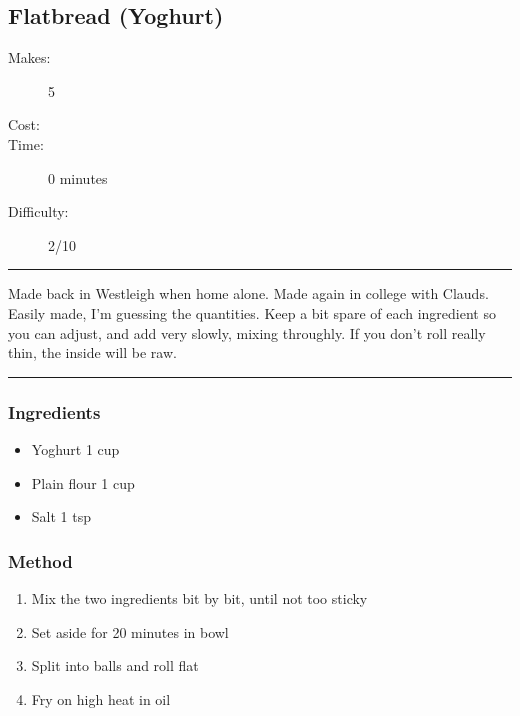\documentclass[]{article}
\begin{document}
\subsection*{\center\huge Flatbread (Yoghurt)}
\begin{description}
\item[Makes:] 5 
\item[Cost:] \textdollar
\item[Time:] 0 minutes
\item[Difficulty:] 2/10
\end{description}
\vspace{0.2cm}\hrule\vspace{0.5cm}
\begin{adjustwidth}{0.5 cm}{0.5 cm}

Made back in Westleigh when home alone. Made again in college with Clauds. Easily made, I'm guessing the quantities. Keep a bit spare of each ingredient so you can adjust, and add very slowly, mixing throughly. If you don't roll really thin, the inside will be raw.  \hfill{}\color{black}

\end{adjustwidth}
\vspace{0.5cm}\hrule
\subsubsection*{\Large Ingredients}
\begin{multicols}{2}
\begin{itemize}
 \item Yoghurt \hfill 1 cup
 \item Plain flour \hfill 1 cup
 \item Salt \hfill 1 tsp
\end{itemize}
\end{multicols}
\subsubsection*{\Large Method}
\begin{enumerate}[font=\huge\color{accent}]
	\item Mix the two ingredients bit by bit, until not too sticky
	\item Set aside for 20 minutes in bowl
	\item Split into balls and roll flat
	\item Fry on high heat in oil
\end{enumerate}
\newpage
{}\label{rec:Pizza Dough}
\end{document}
